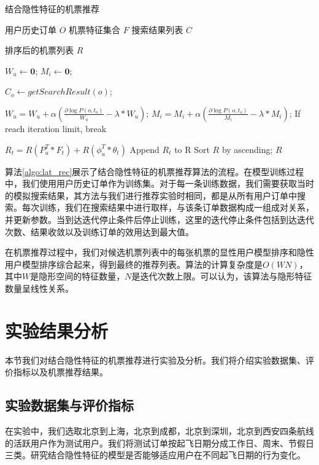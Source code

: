 \begin{algorithm}
\caption{结合隐性特征的机票推荐}
\label{algo:lat_rec}
\begin{algorithmic}[1]
\Require
\Statex 用户历史订单 $O$
\Statex 机票特征集合 $F$
\Statex 搜索结果列表 $C$

\Ensure 
\Statex 排序后的机票列表 $R$

\State $W_u \gets \mathbf{0}$;
\State $M_i \gets \mathbf{0}$;


\State $C_o \gets getSearchResult(o)$;

\State $W_u = W_u + \alpha(\frac{\partial \log P(o,t_o)}{W_u} - \lambda*W_u)$;
\State $M_i = M_i + \alpha(\frac{\partial \log P(o,t_o)}{M_i} - \lambda*M_i)$;
\EndFor
\State If reach iteration limit, break
\EndFor

\State $R_t = R(P_u^T * F_t) + R(\phi_u^T * \theta_t)$
\State Append $R_t$ to R
\EndFor 
\State Sort $R$ by ascending;
\State \Return $R$
\end{algorithmic}
\end{algorithm}

算法\ref{algo:lat_rec}展示了结合隐性特征的机票推荐算法的流程。在模型训练过程中，我们使用用户历史订单作为训练集。对于每一条训练数据，我们需要获取当时的模拟搜索结果，其方法与我们进行推荐实验时相同，都是从所有用户订单中搜索。每次训练，我们在搜索结果中进行取样，与该条订单数据构成一组成对关系，并更新参数。当到达迭代停止条件后停止训练，这里的迭代停止条件包括到达迭代次数、结果收敛以及训练订单的效用达到最大值。

在机票推荐过程中，我们对候选机票列表中的每张机票的显性用户模型排序和隐性用户模型排序综合起来，得到最终的推荐列表。算法的计算复杂度是$O(WN)$，其中$W$是隐形空间的特征数量，$N$是迭代次数上限。可以认为，该算法与隐形特征数量呈线性关系。


\section{实验结果分析}

本节我们对结合隐性特征的机票推荐进行实验及分析。我们将介绍实验数据集、评价指标以及机票推荐结果。

\subsection{实验数据集与评价指标}
在实验中，我们选取北京到上海，北京到成都，北京到深圳，北京到西安四条航线的活跃用户作为测试用户。我们将测试订单按起飞日期分成工作日、周末、节假日三类。研究结合隐性特征的模型是否能够适应用户在不同起飞日期的行为变化。

